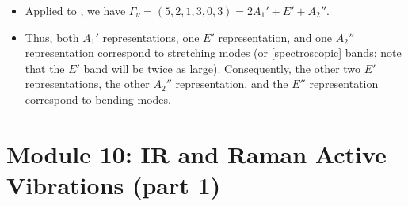 \documentclass[../notes.tex]{subfiles}
\begin{document}
\begin{itemize}
    \begin{itemize}
        \item Applied to , we have $\Gamma_\nu=(5,2,1,3,0,3)=2A_1'+E'+A_2''$.
        \item Thus, both $A_1'$ representations, one $E'$ representation, and one $A_2''$ representation correspond to stretching modes (or [spectroscopic] bands; note that the $E'$ band will be twice as large). Consequently, the other two $E'$ representations, the other $A_2''$ representation, and the $E''$ representation correspond to bending modes.
    \end{itemize}
\end{itemize}



\section{Module 10: IR and Raman Active Vibrations (part 1)}
\end{document}
